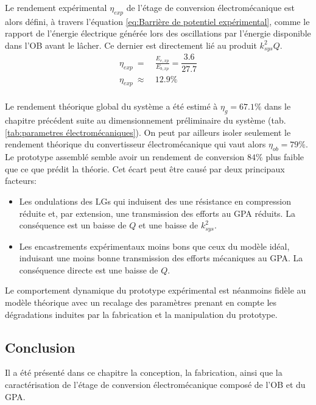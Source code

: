 Le rendement expérimental $\eta _{exp}$ de l'étage de conversion électromécanique est alors défini, à travers l'équation \ref{eq:Barrière de potentiel expérimental}, comme le rapport de l'énergie électrique générée lors des oscillations par l'énergie disponible dans l'OB avant le lâcher. Ce dernier est directement lié au produit $k^2_{sys}Q$.
\begin{equation}
		\begin{split} 
		\eta _{exp}\ =&\ \frac{E_{e,xp}}{E_{b,xp}} = \dfrac{3.6}{27.7} \\
		\eta _{exp}\ \approx &\ 12.9\text{\%} \\
		\end{split}
		\label{eq:Barrière de potentiel expérimental}
\end{equation}

Le rendement théorique global du système a été estimé à $\eta _g=67.1\%$ dans le chapitre précédent suite au dimensionnement préliminaire du système (tab. \ref{tab:parametres électromécaniques}). On peut par ailleurs isoler seulement le rendement théorique du convertisseur électromécanique qui vaut alors $\eta _{ob}=79\%$. Le prototype assemblé semble avoir un rendement de conversion $84\%$ plus faible que ce que prédit la théorie. Cet écart peut être causé par deux principaux facteurs:
\begin{itemize}[label=$\circ$]
	\item Les ondulations des LGs qui induisent des une résistance en compression réduite et, par extension, une transmission des efforts au GPA réduits. La conséquence est un baisse de $Q$ et une baisse de ${k^2_{sys}}$.
	\item Les encastrements expérimentaux moins bons que ceux du modèle idéal, induisant une moins bonne transmission des efforts mécaniques au GPA. La conséquence directe est une baisse de $Q$.
\end{itemize}

Le comportement dynamique du prototype expérimental est néanmoins fidèle au modèle théorique avec un recalage des paramètres prenant en compte les dégradations induites par la fabrication et la manipulation du prototype.
	\subsection{Conclusion}
Il a été présenté dans ce chapitre la conception, la fabrication, ainsi que la caractérisation de l'étage de conversion électromécanique composé de l'OB et du GPA.

